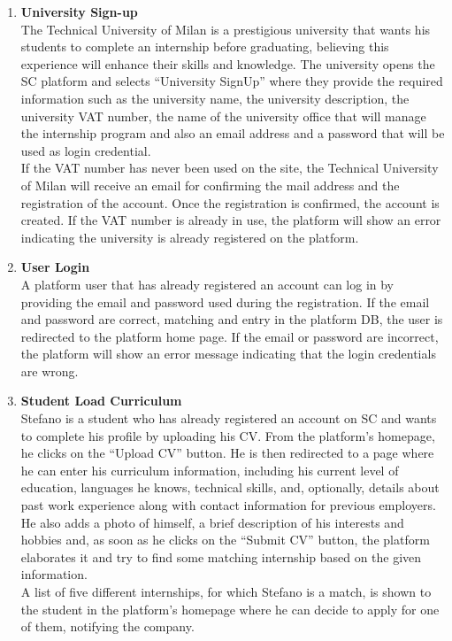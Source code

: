 \begin{enumerate}
    \item \textbf{\textcolor{titleColor}{University Sign-up}}\\
        The Technical University of Milan is a prestigious university that wants his students to complete an internship before graduating, believing this experience will enhance their skills and knowledge. The university opens the SC platform and selects “University SignUp” where they provide the required information such as the university name, the university description, the university VAT number, the name of the university office that will manage the internship program and also an email address and a password that will be used as login credential.\\
        If the VAT number has never been used on the site, the Technical University of Milan will receive an email for confirming the mail address and the registration of the account. Once the registration is confirmed, the account is created.
        If the VAT number is already in use, the platform will show an error indicating the university is already registered on the platform.
    \item \textbf{\textcolor{titleColor}{User Login}}\\
        A platform user that has already registered an account can log in by providing the email and password used during the registration. If the email and password are correct, matching and entry in the platform DB, the user is redirected to the platform home page. If the email or password are incorrect, the platform will show an error message indicating that the login credentials are wrong.
    \item \textbf{\textcolor{titleColor}{Student Load Curriculum}}\\
        Stefano is a student who has already registered an account on SC and wants to complete his profile by uploading his CV. From the platform's homepage, he clicks on the “Upload CV” button. He is then redirected to a page where he can enter his curriculum information, including his current level of education, languages he knows, technical skills, and, optionally, details about past work experience along with contact information for previous employers.
        He also adds a photo of himself, a brief description of his interests and hobbies and, as soon as he clicks on the “Submit CV” button, the platform elaborates it and try to find some matching internship based on the given information.\\
        A list of five different internships, for which Stefano is a match, is shown to the student in the platform's homepage where he can decide to apply for one of them, notifying the company.

\end{enumerate}
